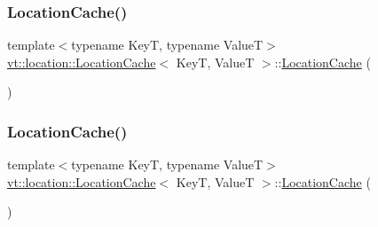 \mbox{\label{structvt_1_1location_1_1_location_cache_a577179b586e3aa1a3d2b3c5dd6a10229}} 
\subsubsection{\texorpdfstring{Location\+Cache()}{LocationCache()}\hspace{0.1cm}{\footnotesize\ttfamily [2/3]}}
{\footnotesize\ttfamily template$<$typename KeyT, typename ValueT$>$ \\
\hyperlink{structvt_1_1location_1_1_location_cache}{vt\+::location\+::\+Location\+Cache}$<$ KeyT, ValueT $>$\+::\hyperlink{structvt_1_1location_1_1_location_cache}{Location\+Cache} (\begin{DoxyParamCaption}\item[{\hyperlink{structvt_1_1location_1_1_location_cache}{Location\+Cache}$<$ KeyT, ValueT $>$ const \&}]{ }\end{DoxyParamCaption})\hspace{0.3cm}{\ttfamily [delete]}}

\mbox{\label{structvt_1_1location_1_1_location_cache_ab6e98f027816ca0bc92d442b63160900}} 
\subsubsection{\texorpdfstring{Location\+Cache()}{LocationCache()}\hspace{0.1cm}{\footnotesize\ttfamily [3/3]}}
{\footnotesize\ttfamily template$<$typename KeyT, typename ValueT$>$ \\
\hyperlink{structvt_1_1location_1_1_location_cache}{vt\+::location\+::\+Location\+Cache}$<$ KeyT, ValueT $>$\+::\hyperlink{structvt_1_1location_1_1_location_cache}{Location\+Cache} (\begin{DoxyParamCaption}\item[{\hyperlink{structvt_1_1location_1_1_location_cache}{Location\+Cache}$<$ KeyT, ValueT $>$ \&\&}]{ }\end{DoxyParamCaption})\hspace{0.3cm}{\ttfamily [default]}}



